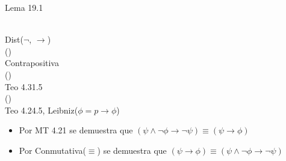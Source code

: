 \documentclass[twoside]{article}
\begin{document}
\begin{subproof}{Lema 19.1}
    \begin{derivation}
            \psi \land \neg\phi \to \neg\psi\\
        Dist($\neg$, $\to$)\\
            \neg(\psi \to \phi) \to \neg\psi\\
        Contrapositiva\\
            \psi \to (\psi \to \phi)\\
        Teo 4.31.5\\
            (\psi \land \psi) \to \phi\\
        Teo 4.24.5, Leibniz($\phi = p \to \phi$)\\
            \psi \to \phi
    \end{derivation}
    \begin{itemize}
        \item[.1] Por MT 4.21 se demuestra que $(\psi \land \neg\phi \to \neg\psi) \equiv (\psi \to \phi)$
        \item[.2] Por Conmutativa($\equiv$) se demuestra que $(\psi \to \phi) \equiv (\psi \land \neg\phi \to \neg\psi)$
    \end{itemize}
\end{subproof}
\end{document}
